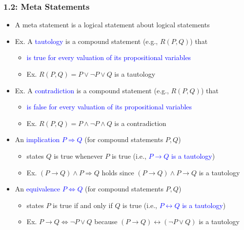 \documentclass[10pt,english]{beamer}
\begin{document}
\begin{frame} \frametitle{1.2: Meta Statements}
  

\begin{itemize}
\setlength\itemsep{2mm}
\item<1-> A meta statement is a logical statement about logical statements


\item<2-> Ex. A \textcolor{blue}{tautology} is a compound statement (e.g., $R(P,Q)$) that \vspace{1mm}
\begin{itemize}
 \setlength\itemsep{1.5mm}
 \item \textcolor{blue}{is true for every valuation of its propositional variables}
 \item Ex. $R(P,Q) = P \vee \neg P \vee Q$ is a tautology
\end{itemize}

\vspace{1mm}

\item<2-> Ex. A \textcolor{blue}{contradiction} is a compound statement (e.g., $R(P,Q)$) that \vspace{1mm}
\begin{itemize}
  \setlength\itemsep{1.5mm}
 \item  \textcolor{blue}{is false for every valuation of its propositional variables}
 \item Ex. $R(P,Q) = P \wedge \neg P \wedge Q$ is a contradiction
\end{itemize}

\vspace{1mm}

\item<3-> An \textcolor{blue}{implication $P \Rightarrow Q$} (for compound statements $P,Q$) \vspace{1mm}
\begin{itemize}
  \setlength\itemsep{1.5mm}
 \item states $Q$ is true whenever $P$ is true (i.e., \textcolor{blue}{$P \rightarrow Q$ is a tautology})
 \item Ex. $(P \rightarrow Q) \wedge P \Rightarrow Q$ holds since $(P \rightarrow Q) \wedge P \rightarrow Q$ is a tautology
\end{itemize}

\item<4-> An \textcolor{blue}{equivalence $P \Leftrightarrow Q$} (for compound statements $P,Q$) \vspace{1mm}
\begin{itemize}
  \setlength\itemsep{1.5mm}
 \item states $P$ is true if and only if $Q$ is true (i.e., \textcolor{blue}{$P \leftrightarrow Q$ is a tautology})
 \item Ex. $P \rightarrow Q \Leftrightarrow \neg P \vee Q$ because $(P \rightarrow Q) \leftrightarrow (\neg P \vee Q)$ is a tautology
\end{itemize}

\end{itemize}


\end{frame}
\end{document}
